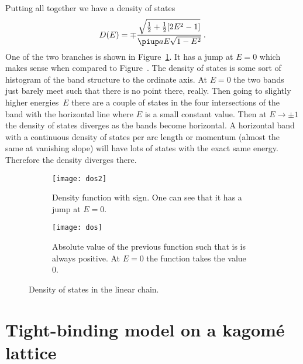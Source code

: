\documentclass[11pt, english, fleqn, DIV=15, headinclude, BCOR=1cm]{scrartcl}
\begin{document}
Putting all together we have a density of states
\[
    D(E) = \mp \frac{\sqrt{\frac 12 + \frac 12 [2 E^2 - 1]}}{\piup a E \sqrt{1 -
    E^2}} \,.
\]
One of the two branches is shown in Figure~\ref{fig:dos/2}. It has a jump at $E
= 0$ which makes sense when compared to Figure~\label{fig:band-3}. The density
of states is some sort of histogram of the band structure to the ordinate axis.
At $E = 0$ the two bands just barely meet such that there is no point there,
really. Then going to slightly higher energies~$E$ there are a couple of states
in the four intersections of the band with the horizontal line where $E$ is a
small constant value. Then at $E \to \pm 1$ the density of states diverges as
the bands become horizontal. A horizontal band with a continuous density of
states per arc length or momentum (almost the same at vanishing slope) will
have lots of states with the exact same energy. Therefore the density diverges
there.

\begin{figure}
    \begin{subfigure}[t]{0.47\linewidth}
        \centering
        \texttt{[image: dos2]}
        \caption{%
            Density function with sign. One can see that it has a jump at $E =
            0$.
        }
        \label{fig:dos/2}
    \end{subfigure}
    \hfill
    \begin{subfigure}[t]{0.47\linewidth}
        \centering
        \texttt{[image: dos]}
        \caption{%
            Absolute value of the previous function such that is is always
            positive. At $E = 0$ the function takes the value 0.
        }
        \label{fig:dos/1}
    \end{subfigure}
    \caption{%
        Density of states in the linear chain.
    }
    \label{fig:dos}
\end{figure}


\section{Tight-binding model on a kagomé lattice}
\label{homework:2}
\end{document}
